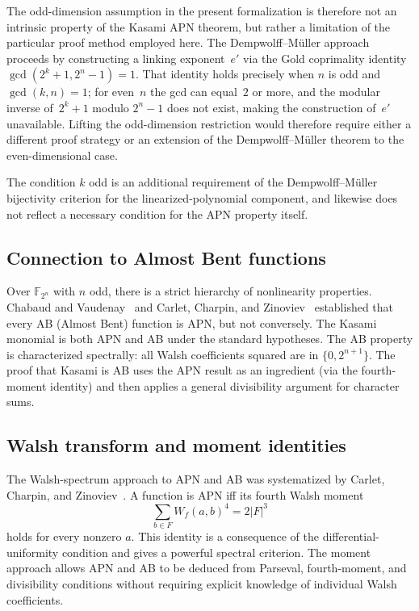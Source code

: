 \documentclass[11pt]{article}
\begin{document}
The odd-dimension assumption in the present formalization is therefore not an intrinsic
property of the Kasami APN theorem, but rather a limitation of the particular proof
method employed here. The Dempwolff--M\"{u}ller approach~\cite{DempwolffMueller2021}
proceeds by constructing a linking exponent~$e'$ via the Gold coprimality identity
$\gcd(2^k+1,2^n-1)=1$. That identity holds precisely when $n$ is odd and $\gcd(k,n)=1$;
for even~$n$ the gcd can equal~$2$ or more, and the modular inverse of~$2^k+1$ modulo
$2^n-1$ does not exist, making the construction of~$e'$ unavailable. Lifting the
odd-dimension restriction would therefore require either a different proof strategy or
an extension of the Dempwolff--M\"{u}ller theorem to the even-dimensional case.

The condition $k$ odd is an additional requirement of the Dempwolff--M\"{u}ller
bijectivity criterion for the linearized-polynomial component, and likewise does not
reflect a necessary condition for the APN property itself.

\subsection{Connection to Almost Bent functions}
Over $\mathbb{F}_{2^n}$ with $n$ odd, there is a strict hierarchy of nonlinearity properties.
Chabaud and Vaudenay~\cite{ChabaudVaudenay1994} and Carlet, Charpin, and
Zinoviev~\cite{CarletCharpinZinoviev1998} established that every AB (Almost Bent) function
is APN, but not conversely. The Kasami monomial is both APN and AB under the standard
hypotheses. The AB property is characterized spectrally: all Walsh coefficients squared are
in $\{0,2^{n+1}\}$. The proof that Kasami is AB uses the APN result as an ingredient (via
the fourth-moment identity) and then applies a general divisibility argument for character sums.

\subsection{Walsh transform and moment identities}
The Walsh-spectrum approach to APN and AB was systematized by Carlet, Charpin, and
Zinoviev~\cite{CarletCharpinZinoviev1998}. A function is APN iff its fourth Walsh moment
\[
  \sum_{b\in F} W_f(a,b)^4 = 2|F|^3
\]
holds for every nonzero $a$. This identity is a consequence of the differential-uniformity
condition and gives a powerful spectral criterion. The moment approach allows APN and AB to
be deduced from Parseval, fourth-moment, and divisibility conditions without requiring
explicit knowledge of individual Walsh coefficients.
\end{document}
